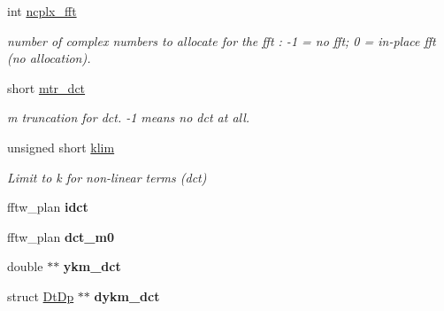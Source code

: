 \begin{DoxyCompactItemize}
\item 
\hypertarget{structshtns__info_a30fd69b66eeb67e111ef1689bfb2d549}{}int \hyperlink{structshtns__info_a30fd69b66eeb67e111ef1689bfb2d549}{ncplx\+\_\+fft}\label{structshtns__info_a30fd69b66eeb67e111ef1689bfb2d549}

\begin{DoxyCompactList}\small\item\em number of complex numbers to allocate for the fft \+: -\/1 = no fft; 0 = in-\/place fft (no allocation). \end{DoxyCompactList}\item 
\hypertarget{structshtns__info_afacdb118d7b598332508ca8cfa914e15}{}short \hyperlink{structshtns__info_afacdb118d7b598332508ca8cfa914e15}{mtr\+\_\+dct}\label{structshtns__info_afacdb118d7b598332508ca8cfa914e15}

\begin{DoxyCompactList}\small\item\em m truncation for dct. -\/1 means no dct at all. \end{DoxyCompactList}\item 
\hypertarget{structshtns__info_ad09115673d1275202501773f5a9f4875}{}unsigned short \hyperlink{structshtns__info_ad09115673d1275202501773f5a9f4875}{klim}\label{structshtns__info_ad09115673d1275202501773f5a9f4875}

\begin{DoxyCompactList}\small\item\em Limit to k for non-\/linear terms (dct) \end{DoxyCompactList}\item 
\hypertarget{structshtns__info_afe6e0dd06bb2e18ff0fcfaa2168a43f0}{}fftw\+\_\+plan {\bfseries idct}\label{structshtns__info_afe6e0dd06bb2e18ff0fcfaa2168a43f0}

\item 
\hypertarget{structshtns__info_a40185ae400d63e36277001195f04faa3}{}fftw\+\_\+plan {\bfseries dct\+\_\+m0}\label{structshtns__info_a40185ae400d63e36277001195f04faa3}

\item 
\hypertarget{structshtns__info_afb9f0119337e2012361457ed314cac05}{}double $\ast$$\ast$ {\bfseries ykm\+\_\+dct}\label{structshtns__info_afb9f0119337e2012361457ed314cac05}

\item 
\hypertarget{structshtns__info_ada1d3cdc70137b0bf8bdaf5508451917}{}struct \hyperlink{structDtDp}{Dt\+Dp} $\ast$$\ast$ {\bfseries dykm\+\_\+dct}\label{structshtns__info_ada1d3cdc70137b0bf8bdaf5508451917}


\end{DoxyCompactItemize}

